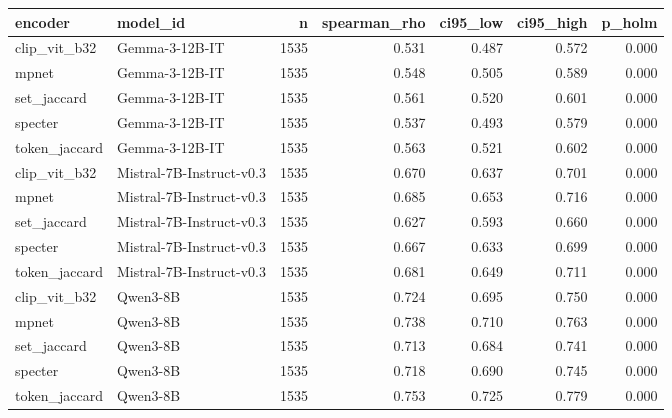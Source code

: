 \begin{tabular}{llrrrrr}
\toprule
encoder & model\_id & n & spearman\_rho & ci95\_low & ci95\_high & p\_holm \\
\midrule
clip\_vit\_b32 & Gemma-3-12B-IT & 1535 & 0.531 & 0.487 & 0.572 & 0.000 \\
mpnet & Gemma-3-12B-IT & 1535 & 0.548 & 0.505 & 0.589 & 0.000 \\
set\_jaccard & Gemma-3-12B-IT & 1535 & 0.561 & 0.520 & 0.601 & 0.000 \\
specter & Gemma-3-12B-IT & 1535 & 0.537 & 0.493 & 0.579 & 0.000 \\
token\_jaccard & Gemma-3-12B-IT & 1535 & 0.563 & 0.521 & 0.602 & 0.000 \\
clip\_vit\_b32 & Mistral-7B-Instruct-v0.3 & 1535 & 0.670 & 0.637 & 0.701 & 0.000 \\
mpnet & Mistral-7B-Instruct-v0.3 & 1535 & 0.685 & 0.653 & 0.716 & 0.000 \\
set\_jaccard & Mistral-7B-Instruct-v0.3 & 1535 & 0.627 & 0.593 & 0.660 & 0.000 \\
specter & Mistral-7B-Instruct-v0.3 & 1535 & 0.667 & 0.633 & 0.699 & 0.000 \\
token\_jaccard & Mistral-7B-Instruct-v0.3 & 1535 & 0.681 & 0.649 & 0.711 & 0.000 \\
clip\_vit\_b32 & Qwen3-8B & 1535 & 0.724 & 0.695 & 0.750 & 0.000 \\
mpnet & Qwen3-8B & 1535 & 0.738 & 0.710 & 0.763 & 0.000 \\
set\_jaccard & Qwen3-8B & 1535 & 0.713 & 0.684 & 0.741 & 0.000 \\
specter & Qwen3-8B & 1535 & 0.718 & 0.690 & 0.745 & 0.000 \\
token\_jaccard & Qwen3-8B & 1535 & 0.753 & 0.725 & 0.779 & 0.000 \\
\bottomrule
\end{tabular}

